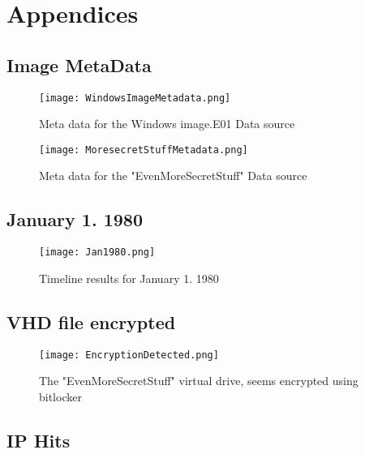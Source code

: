 \documentclass[
	letterpaper, %
	10pt, %
	unnumberedsections, %
	twoside, %
]{APAAssignment}
\begin{document}
\chapter{Appendices}
\begin{appendices}

	\section{Image MetaData}\label{app:MetaData}


	\begin{figure}[!h] %
		\centering
		\texttt{[image: WindowsImageMetadata.png]}
		\caption{Meta data for the Windows image.E01 Data source}
		\label{fig:windowsIageMetadata}
	\end{figure}


	\begin{figure}[!h] %
		\centering
		\texttt{[image: MoresecretStuffMetadata.png]}
		\caption{Meta data for the "EvenMoreSecretStuff" Data source}
		\label{fig:evenMoreSecretStuffMetaData}
	\end{figure}


	\clearpage
	\section{January 1. 1980}\label{app:Jan1980}


	\begin{figure}[!h] %
		\centering
		\texttt{[image: Jan1980.png]}
		\caption{Timeline results for January 1. 1980}
		\label{fig:Jan1980}
	\end{figure}

	\section{VHD file encrypted}\label{app:SecretDriveEncrypted}

	\begin{figure}[!ht] %
		\centering
		\texttt{[image: EncryptionDetected.png]}
		\caption{The "EvenMoreSecretStuff" virtual drive, seems encrypted using bitlocker}
		\label{fig:MoreSecretStuffEncrypted}
	\end{figure}

	\section{IP Hits}\label{app:IpHits}


\end{appendices}
\end{document}
